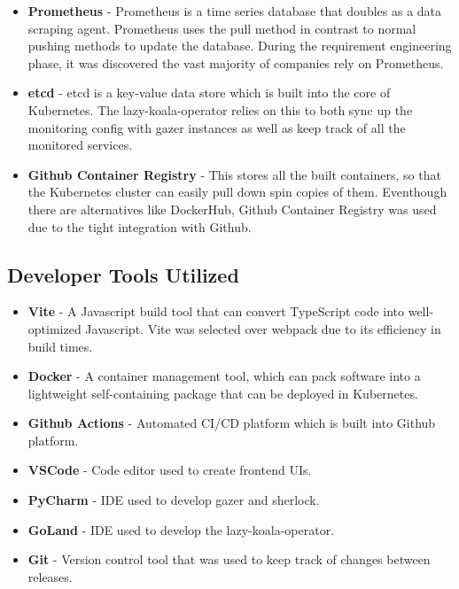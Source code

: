 \begin{itemize}[noitemsep,nolistsep] 
    \item \textbf{Prometheus} - Prometheus is a time series database that doubles as a data scraping agent. Prometheus uses the pull method in contrast to normal pushing methods to update the database. During the requirement engineering phase, it was discovered the vast majority of companies rely on Prometheus. %
    \item \textbf{etcd} - etcd is a key-value data store which is built into the core of Kubernetes. The \ac{lazy-koala-operator} relies on this to both sync up the monitoring config with \ac{gazer} instances as well as keep track of all the monitored services.
    \item \textbf{Github Container Registry} - This stores all the built containers, so that the Kubernetes cluster can easily pull down spin copies of them. Eventhough there are alternatives like DockerHub, Github Container Registry was used due to the tight integration with Github.  
\end{itemize}

\subsection{Developer Tools Utilized}
\begin{itemize}[noitemsep,nolistsep] 
    \item \textbf{Vite} - A Javascript build tool that can convert TypeScript code into well-optimized Javascript. Vite was selected over webpack due to its efficiency in build times.
    \item \textbf{Docker} - A container management tool, which can pack software into a lightweight self-containing package that can be deployed in Kubernetes.
    \item \textbf{Github Actions} - Automated CI/CD platform which is built into Github platform.
    \item \textbf{VSCode} - Code editor used to create frontend UIs.
    \item \textbf{PyCharm} - IDE used to develop \ac{gazer} and \ac{sherlock}.
    \item \textbf{GoLand} - IDE used to develop the \ac{lazy-koala-operator}.
    \item \textbf{Git} - Version control tool that was used to keep track of changes between releases.
\end{itemize}

